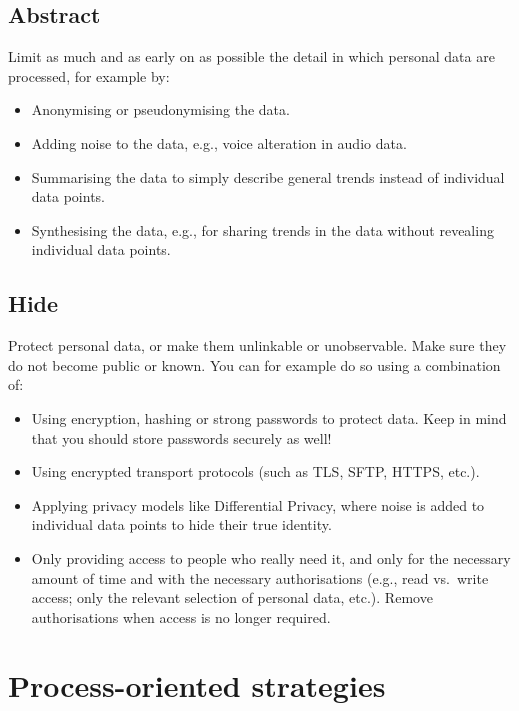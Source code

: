 \documentclass[
]{book}
\providecommand{\tightlist}{%
  \setlength{\itemsep}{0pt}\setlength{\parskip}{0pt}}
\begin{document}
\hypertarget{abstract}{%
\subsection{Abstract}\label{abstract}}

Limit as much and as early on as possible the detail in which personal data
are processed, for example by:

\begin{itemize}
\tightlist
\item
  Anonymising or pseudonymising the data.
\item
  Adding noise to the data, e.g., voice alteration in audio data.
\item
  Summarising the data to simply describe general trends instead of individual
  data points.
\item
  Synthesising the data, e.g., for sharing trends
  in the data without revealing individual data points.
\end{itemize}

\hypertarget{hide}{%
\subsection{Hide}\label{hide}}

Protect personal data, or make them unlinkable or unobservable. Make sure they
do not become public or known. You can for example do so using a combination of:

\begin{itemize}
\tightlist
\item
  Using encryption, hashing or
  strong passwords to protect data. Keep in mind that you
  should store passwords securely as well!
\item
  Using encrypted transport protocols (such as TLS, SFTP, HTTPS, etc.).
\item
  Applying privacy models like Differential Privacy,
  where noise is added to individual data points to hide their true identity.
\item
  Only providing access to people who really need it, and only for the necessary
  amount of time and with the necessary authorisations (e.g., read vs.~write
  access; only the relevant selection of personal data, etc.). Remove
  authorisations when access is no longer required.
\end{itemize}

\hypertarget{process-oriented-strategies}{%
\section{Process-oriented strategies}\label{process-oriented-strategies}}
\end{document}
